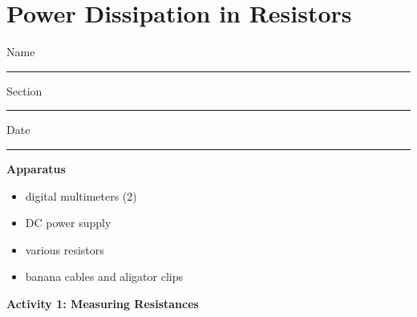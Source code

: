 \section{Power Dissipation in Resistors}

Name \rule{2.0in}{0.1pt}\hfill{}Section \rule{1.0in}{0.1pt}\hfill{}Date
\rule{1.0in}{0.1pt}

\textbf{Apparatus}
\begin{itemize}
\item digital multimeters (2)
\item DC power supply 
\item various resistors
\item banana cables and aligator clips
\end{itemize}

\textbf{Activity 1: Measuring Resistances}

